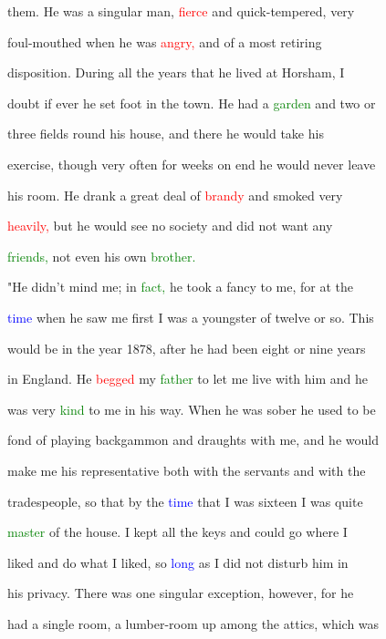  them. He was a singular man, \textcolor{red}{fierce} and quick-tempered, very

 foul-mouthed when he was \textcolor{red}{angry,} and of a most retiring

 disposition. During all the years that he lived at Horsham, I

 \textcolor{BurntOrange}{doubt} if ever he set foot in the town. He had a \textcolor{green}{garden} and two or

 three fields round his house, and there he would take his

 exercise, though very often for weeks on end he would never \textcolor{BurntOrange}{leave}

 his room. He drank a great \textcolor{BurntOrange}{deal} of \textcolor{red}{brandy} and smoked very

 \textcolor{red}{heavily,} but he would see no society and did not want any

 \textcolor{green}{friends,} not even his own \textcolor{green}{brother.}



 "He didn't mind me; in \textcolor{green}{fact,} he took a \textcolor{BurntOrange}{fancy} to me, for at the

 \textcolor{blue}{time} when he saw me first I was a youngster of twelve or so. This

 would be in the year 1878, after he had been eight or nine years

 in England. He \textcolor{red}{begged} my \textcolor{green}{father} to let me live with him and he

 was very \textcolor{green}{kind} to me in his way. When he was sober he used to be

 fond of playing backgammon and draughts with me, and he would

 make me his representative both with the \textcolor{BurntOrange}{servants} and with the

 tradespeople, so that by the \textcolor{blue}{time} that I was sixteen I was quite

 \textcolor{green}{master} of the house. I kept all the keys and could go where I

 liked and do what I liked, so \textcolor{blue}{long} as I did not disturb him in

 his privacy. There was one singular exception, however, for he

 had a single room, a lumber-room up among the attics, which was

